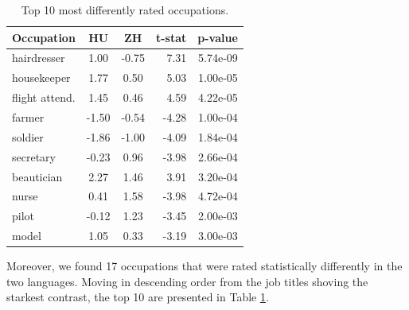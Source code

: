 \documentclass[10pt, a4paper]{article}
\begin{document}

\begin{table}
  \caption{Top 10 most differently rated occupations.}
  \centering
  \begin{tabular}{@{}lccrr@{}}
    \toprule
    \textbf{Occupation} & \textbf{HU} & \textbf{ZH} & \textbf{t-stat} & \textbf{p-value} \\
    \midrule
    hairdresser & 1.00 & -0.75 & 7.31 & 5.74e-09 \\
    housekeeper & 1.77 & 0.50 & 5.03 & 1.00e-05 \\
    flight attend. & 1.45 & 0.46 & 4.59 & 4.22e-05 \\
    farmer & -1.50 & -0.54 & -4.28 & 1.00e-04 \\
    soldier & -1.86 & -1.00 & -4.09 & 1.84e-04 \\
    secretary & -0.23 & 0.96 & -3.98 & 2.66e-04 \\
    beautician & 2.27 & 1.46 & 3.91 & 3.20e-04 \\
    nurse & 0.41 & 1.58 & -3.98 & 4.72e-04 \\
    pilot & -0.12 & 1.23 & -3.45 & 2.00e-03 \\
    model & 1.05 & 0.33 & -3.19 & 3.00e-03 \\
    \bottomrule
  \end{tabular}
  \label{tab:top_different}
\end{table}





Moreover, we found 17 occupations that were rated statistically differently in the two languages. Moving in descending order from the job titles shoving the starkest contrast, the top 10 are presented in Table \ref{tab:top_different}.
\end{document}
